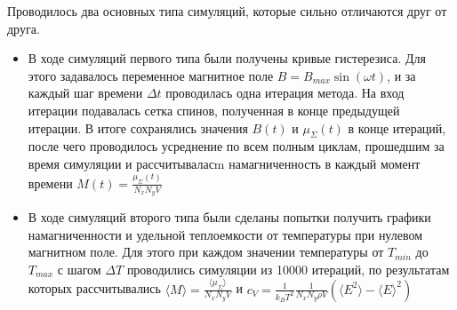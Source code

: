 \documentclass[oneside,final,14pt]{extarticle}
\begin{document}
	Проводилось два основных типа симуляций, которые сильно отличаются друг от друга.
	\begin{itemize}
	\item В ходе симуляций первого типа были получены кривые гистерезиса. Для этого задавалось переменное магнитное поле $B=B_{max}\sin(\omega t)$, и за каждый шаг времени $\Delta t$ проводилась одна итерация метода. На вход итерации подавалась сетка спинов, полученная в конце предыдущей итерации. В итоге сохранялись значения $B(t)$ и $\mu_{\Sigma}(t)$ в конце итераций, после чего проводилось усреднение по всем полным циклам, прошедшим за время симуляции и рассчитываласm намагниченность в каждый момент времени $M(t)=\frac{\mu_{\Sigma}(t)}{N_{x}N_{y}V}$
	\item В ходе симуляций второго типа были сделаны попытки получить графики намагниченности и удельной теплоемкости от температуры при нулевом магнитном поле. Для этого при каждом значении температуры от $T_{min}$ до $T_{max}$ с шагом $\Delta T$ проводились симуляции из 10000 итераций, по результатам которых рассчитывались $\langle M \rangle =\frac{\langle \mu_{\Sigma} \rangle}{N_{x}N_{y}V}$ и $c_{V}=\frac{1}{k_{B}T^2}\frac{1}{N_{x}N_{y}\rho V}(\langle E^2 \rangle - {\langle E \rangle}^2)$
	\end{itemize}
\end{document}
